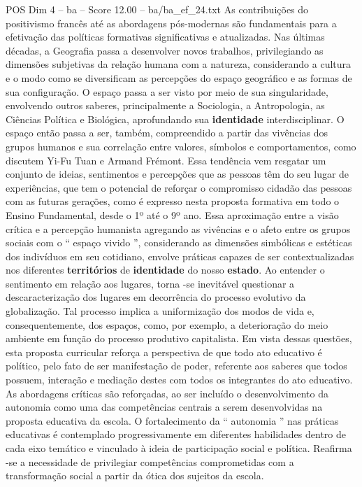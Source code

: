 \begin{textsample}{POS Dim 4 – ba – Score 12.00 – ba/ba\_ef\_24.txt}
As contribuições do positivismo francês até as abordagens pós-modernas são fundamentais para a efetivação das políticas formativas significativas e atualizadas.
Nas últimas décadas, a Geografia passa a desenvolver novos trabalhos, privilegiando as dimensões subjetivas da relação humana com a natureza, considerando a cultura e o modo como se diversificam as percepções do espaço geográfico e as formas de sua configuração.
O espaço passa a ser visto por meio de sua singularidade, envolvendo outros saberes, principalmente a Sociologia, a Antropologia, as Ciências Política e Biológica, aprofundando sua \textbf{identidade} interdisciplinar.
O espaço então passa a ser, também, compreendido a partir das vivências dos grupos humanos e sua correlação entre valores, símbolos e comportamentos, como discutem Yi-Fu Tuan e Armand Frémont.
Essa tendência vem resgatar um conjunto de ideias, sentimentos e percepções que as pessoas têm do seu lugar de experiências, que tem o potencial de reforçar o compromisso cidadão das pessoas com as futuras gerações, como é expresso nesta proposta formativa em todo o Ensino Fundamental, desde o 1º até o 9º ano.
Essa aproximação entre a visão crítica e a percepção humanista agregando as vivências e o afeto entre os grupos sociais com o “ espaço vivido ”, considerando as dimensões simbólicas e estéticas dos indivíduos em seu cotidiano, envolve práticas capazes de ser contextualizadas nos diferentes \textbf{territórios} de \textbf{identidade} do nosso \textbf{estado}.
Ao entender o sentimento em relação aos lugares, torna -se inevitável questionar a descaracterização dos lugares em decorrência do processo evolutivo da globalização.
Tal processo implica a uniformização dos modos de vida e, consequentemente, dos espaços, como, por exemplo, a deterioração do meio ambiente em função do processo produtivo capitalista.
Em vista dessas questões, esta proposta curricular reforça a perspectiva de que todo ato educativo é político, pelo fato de ser manifestação de poder, referente aos saberes que todos possuem, interação e mediação destes com todos os integrantes do ato educativo.
As abordagens críticas são reforçadas, ao ser incluído o desenvolvimento da autonomia como uma das competências centrais a serem desenvolvidas na proposta educativa da escola.
O fortalecimento da “ autonomia ” nas práticas educativas é contemplado progressivamente em diferentes habilidades dentro de cada eixo temático e vinculado à ideia de participação social e política.
Reafirma -se a necessidade de privilegiar competências comprometidas com a transformação social a partir da ótica dos sujeitos da escola.

\end{textsample}

